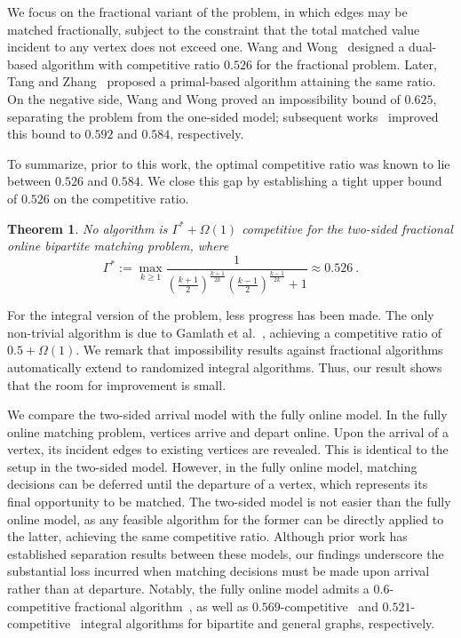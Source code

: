 \documentclass[11pt,letterpaper]{article}
\newtheorem{theorem}{Theorem}[section]
\begin{document}
We focus on the fractional variant of the problem, in which edges may be matched fractionally, subject to the constraint that the total matched value incident to any vertex does not exceed one. Wang and Wong~\cite{icalp/WangW15} designed a dual-based algorithm with competitive ratio $0.526$ for the fractional problem. Later, Tang and Zhang~\cite{ec/TangZ24} proposed a primal-based algorithm attaining the same ratio. On the negative side, Wang and Wong proved an impossibility bound of $0.625$, separating the problem from the one-sided model; subsequent works~\cite{algorithmica/BuchbinderST19,ec/TangZ24} improved this bound to $0.592$ and $0.584$, respectively.

To summarize, prior to this work, the optimal competitive ratio was known to lie between $0.526$ and $0.584$.
We close this gap by establishing a tight upper bound of $0.526$ on the competitive ratio.
\begin{theorem}
\label{thm:main}
	No algorithm is $\Gamma^*+\Omega(1)$ competitive for the two-sided fractional online bipartite matching problem, where 
\[
\Gamma^* := \max_{k\ge 1} \frac{1}{\left( \frac{k+1}{2}\right)^{\frac{k+1}{2k}} \left( \frac{k-1}{2}\right)^{\frac{k-1}{2k}}+1} \approx 0.526~.
\]
\end{theorem}

For the integral version of the problem, less progress has been made. The only non-trivial algorithm is due to Gamlath et al.~\cite{focs/GamlathKMSW19}, achieving a competitive ratio of $0.5+\Omega(1)$. We remark that impossibility results against fractional algorithms automatically extend to randomized integral algorithms. Thus, our result shows that the room for improvement is small.

We compare the two-sided arrival model with the fully online model. In the fully online matching problem, vertices arrive and depart online. Upon the arrival of a vertex, its incident edges to existing vertices are revealed. This is identical to the setup in the two-sided model. However, in the fully online model, matching decisions can be deferred until the departure of a vertex, which represents its final opportunity to be matched. The two-sided model is not easier than the fully online model, as any feasible algorithm for the former can be directly applied to the latter, achieving the same competitive ratio. Although prior work has established separation results between these models, our findings underscore the substantial loss incurred when matching decisions must be made upon arrival rather than at departure. Notably, the fully online model admits a $0.6$-competitive fractional algorithm~\cite{soda/HuangPTTWZ19,focs/HuangTWZ20,ec/TangZ24}, as well as $0.569$-competitive~\cite{focs/HuangTWZ20} and $0.521$-competitive~\cite{jacm/HuangKTWZZ20} integral algorithms for bipartite and general graphs, respectively.
\end{document}
